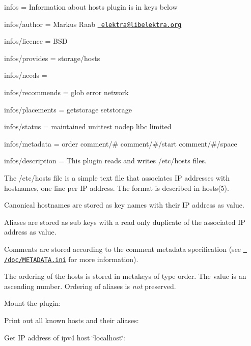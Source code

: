 
\begin{DoxyItemize}
\item infos = Information about hosts plugin is in keys below
\item infos/author = Markus Raab \href{mailto:elektra@libelektra.org}{\texttt{ elektra@libelektra.\+org}}
\item infos/licence = B\+SD
\item infos/provides = storage/hosts
\item infos/needs =
\item infos/recommends = glob error network
\item infos/placements = getstorage setstorage
\item infos/status = maintained unittest nodep libc limited
\item infos/metadata = order comment/\# comment/\#/start comment/\#/space
\item infos/description = This plugin reads and writes /etc/hosts files.
\end{DoxyItemize}

The {\ttfamily /etc/hosts} file is a simple text file that associates IP addresses with hostnames, one line per IP address. The format is described in {\ttfamily hosts(5)}.

Canonical hostnames are stored as key names with their IP address as value.

Aliases are stored as sub keys with a read only duplicate of the associated IP address as value.

Comments are stored according to the comment metadata specification (see \href{/home/mpranj/workspace/libelektra/doc/METADATA.ini}{\texttt{ /doc/\+M\+E\+T\+A\+D\+A\+TA.ini}} for more information).

The ordering of the hosts is stored in metakeys of type {\ttfamily order}. The value is an ascending number. Ordering of aliases is {\itshape not} preserved.

Mount the plugin\+:


\begin{DoxyCode}{0}
\end{DoxyCode}


Print out all known hosts and their aliases\+:


\begin{DoxyCode}{0}
\end{DoxyCode}


Get IP address of ipv4 host \char`\"{}localhost\char`\"{}\+:


